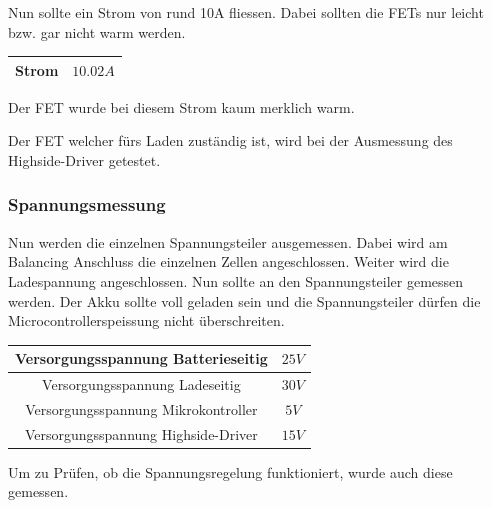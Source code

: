 Nun sollte ein Strom von rund 10A fliessen. Dabei sollten die FETs nur leicht bzw. gar nicht warm werden.

\begin{center}
	\begin{tabular}{|c|c|}
		\hline 
		Strom & $10.02A$ \\ \hline
	\end{tabular} 
	\label{tab:StromMotorcontrollFET}
\end{center}

Der FET wurde bei diesem Strom kaum merklich warm.

Der FET welcher fürs Laden zuständig ist, wird bei der Ausmessung des Highside-Driver getestet.

\subsubsection*{Spannungsmessung}
Nun werden die einzelnen Spannungsteiler ausgemessen. Dabei wird am Balancing Anschluss die einzelnen Zellen angeschlossen. Weiter wird die Ladespannung angeschlossen. Nun sollte an den Spannungsteiler gemessen werden. Der Akku sollte voll geladen sein und die Spannungsteiler dürfen die Microcontrollerspeissung nicht überschreiten.

\begin{center}
	\begin{tabular}{|c|c|}
		\hline 
		Versorgungsspannung Batterieseitig & $25V$ \\ \hline
		Versorgungsspannung Ladeseitig & $30V$ \\ \hline
		Versorgungsspannung Mikrokontroller & $5V$ \\ \hline
		Versorgungsspannung Highside-Driver & $15V$ \\ \hline
		
	\end{tabular} 
	\label{tab:BedingungSpannungsmessungen}
\end{center}

Um zu Prüfen, ob die Spannungsregelung funktioniert, wurde auch diese gemessen.

